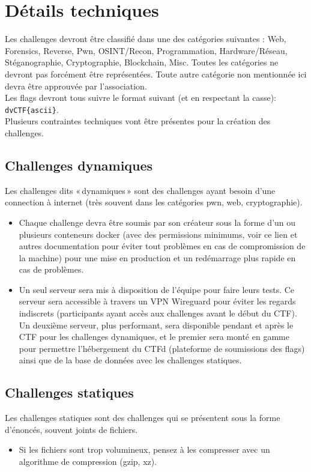 \documentclass[12pt]{article}
\begin{document}
    \section{Détails techniques}

Les challenges devront être classifié dans une des catégories suivantes : Web, Forensics, Reverse, Pwn, OSINT/Recon, Programmation, Hardware/Réseau, Stéganographie, Cryptographie, Blockchain, Misc. Toutes les catégories ne devront pas forcément être représentées.  Toute autre catégorie non mentionnée ici devra être approuvée par l’association.\\
Les flags devront tous suivre le format suivant (et en respectant la casse): \verb+dvCTF{ascii}+.\\
Plusieurs contraintes techniques vont être présentes pour la création des challenges.

    \subsection{Challenges dynamiques}

Les challenges dits « dynamiques » sont des challenges ayant besoin d’une connection à internet (très souvent dans les catégories pwn, web, cryptographie).

    \begin{itemize}
        \item{Chaque challenge devra être soumis par son créateur sous la forme d’un ou plusieurs conteneurs docker (avec des permissions minimums, voir ce lien et autres documentation pour éviter tout problèmes en cas de compromission de la machine) pour une mise en production et un redémarrage plus rapide en cas de problèmes.}
        \item{Un seul serveur sera mis à disposition de l’équipe pour faire leurs tests. Ce serveur sera accessible à travers un VPN Wireguard pour éviter les regards indiscrets (participants ayant accès aux challenges avant le début du CTF). Un deuxième serveur, plus performant, sera disponible pendant et après le CTF pour les challenges dynamiques, et le premier sera monté en gamme pour permettre l’hébergement du CTFd (plateforme de soumissions des flags) ainsi que de la base de données avec les challenges statiques.}
    \end{itemize}

    \subsection{Challenges statiques}

    Les challenges statiques sont des challenges qui se présentent sous la forme d’énoncés, souvent joints de fichiers.

    \begin{itemize}
        \item{Si les fichiers sont trop volumineux, pensez à les compresser avec un algorithme de compression (gzip, xz).}
    \end{itemize}
\end{document}
